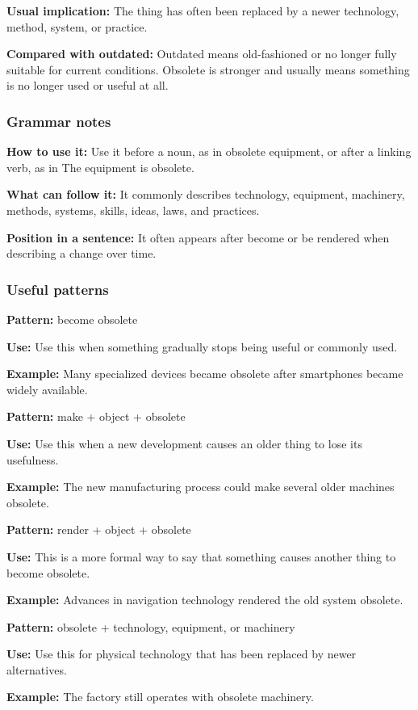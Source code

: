\documentclass[11pt]{article}
\begin{document}
\textbf{Usual implication:} The thing has often been replaced by a newer technology, method, system, or practice.

\textbf{Compared with outdated:} Outdated means old-fashioned or no longer fully suitable for current conditions. Obsolete is stronger and usually means something is no longer used or useful at all.

\subsubsection{Grammar notes}
\textbf{How to use it:} Use it before a noun, as in obsolete equipment, or after a linking verb, as in The equipment is obsolete.

\textbf{What can follow it:} It commonly describes technology, equipment, machinery, methods, systems, skills, ideas, laws, and practices.

\textbf{Position in a sentence:} It often appears after become or be rendered when describing a change over time.

\subsubsection{Useful patterns}
\textbf{Pattern:} become obsolete

\textbf{Use:} Use this when something gradually stops being useful or commonly used.

\textbf{Example:} Many specialized devices became obsolete after smartphones became widely available.

\textbf{Pattern:} make + object + obsolete

\textbf{Use:} Use this when a new development causes an older thing to lose its usefulness.

\textbf{Example:} The new manufacturing process could make several older machines obsolete.

\textbf{Pattern:} render + object + obsolete

\textbf{Use:} This is a more formal way to say that something causes another thing to become obsolete.

\textbf{Example:} Advances in navigation technology rendered the old system obsolete.

\textbf{Pattern:} obsolete + technology, equipment, or machinery

\textbf{Use:} Use this for physical technology that has been replaced by newer alternatives.

\textbf{Example:} The factory still operates with obsolete machinery.
\end{document}
